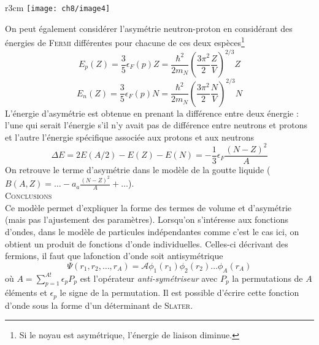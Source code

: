 	\begin{wrapfigure}[8]{r}{3cm}
	\vspace{-5mm}
	\texttt{[image: ch8/image4]}
	\end{wrapfigure}
On peut également considérer l'asymétrie neutron-proton en considérant des énergies de \textsc{Fermi} différentes
pour chacune de ces deux espèces\footnote{Si le noyau est asymétrique, l'énergie de liaison diminue.}
\begin{equation}
E_p(Z) = \frac{3}{5}\epsilon_F(p)Z = \frac{\hbar^2}{2m_N}\left(\frac{3\pi^2}{2}\frac{Z}{V}\right)^{2/3}Z
\end{equation}
\begin{equation}
E_n(Z) = \frac{3}{5}\epsilon_F(p)N = \frac{\hbar^2}{2m_N}\left(\frac{3\pi^2}{2}\frac{N}{V}\right)^{2/3}N
\end{equation}
L'énergie d'asymétrie est obtenue en prenant la différence entre deux énergie : l'une qui serait l'énergie 
s'il n'y avait pas de différence entre neutrons et protons et l'autre l'énergie spécifique associée aux 
protons et aux neutrons
\begin{equation}
\Delta E = 2E(A/2)-E(Z)-E(N) = -\frac{1}{3}\epsilon_F\frac{(N-Z)^2}{A}
\end{equation}
On retrouve le terme d'asymétrie dans le modèle de la goutte liquide ($B(A,Z) = \dots - a_a\frac{(N-Z)^2}{A}+
\dots$).\\

\textsc{Conclusions}\\
Ce modèle permet d'expliquer la forme des termes de volume et d'asymétrie (mais pas l'ajustement des 
paramètres). Lorsqu'on s'intéresse aux fonctions d'ondes, dans le modèle de particules indépendantes comme
c'est le cas ici, on obtient un produit de fonctions d'onde individuelles. Celles-ci décrivant des fermions,
il faut que lafonction d'onde soit antisymétrique
\begin{equation}
\Psi(r_1,r_2,\dots, r_A) =\mathcal{A} \phi_1(r_1)\phi_2(r_2)\dots\phi_A(r_A)
\end{equation}
où $A =\sum_{p=1}^{A!} \epsilon_pP_p$ est l'opérateur \textit{anti-symétriseur} avec $P_p$ la permutations de 
$A$ éléments et $\epsilon_p$ le signe de la permutation. Il est possible d'écrire cette fonction d'onde sous
la forme d'un déterminant de \textsc{Slater}.










